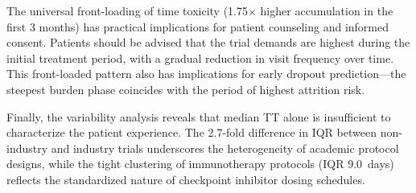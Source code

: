 \documentclass[11pt,a4paper]{article}
\begin{document}
The universal front-loading of time toxicity (1.75$\times$ higher accumulation in the first 3 months) has practical implications for patient counseling and informed consent. Patients should be advised that the trial demands are highest during the initial treatment period, with a gradual reduction in visit frequency over time. This front-loaded pattern also has implications for early dropout prediction---the steepest burden phase coincides with the period of highest attrition risk.

Finally, the variability analysis reveals that median TT alone is insufficient to characterize the patient experience. The 2.7-fold difference in IQR between non-industry and industry trials underscores the heterogeneity of academic protocol designs, while the tight clustering of immunotherapy protocols (IQR 9.0~days) reflects the standardized nature of checkpoint inhibitor dosing schedules.
\end{document}
